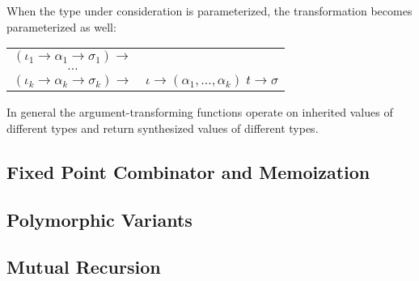 When the type under consideration is parameterized, the transformation becomes parameterized as well:

\begin{tabular}{cl}
  $(\iota_1 \to \alpha_1 \to \sigma_1) \to$ & \\
  $\dots$                                  & \\
  $(\iota_k \to \alpha_k \to \sigma_k) \to$ & $\iota \to (\alpha_1,\dots,\alpha_k)\;t \to \sigma$
\end{tabular}

In general the argument-transforming functions operate on inherited values of different types and return synthesized values of different types.

\subsection{Fixed Point Combinator and Memoization}

\subsection{Polymorphic Variants}

\subsection{Mutual Recursion}
